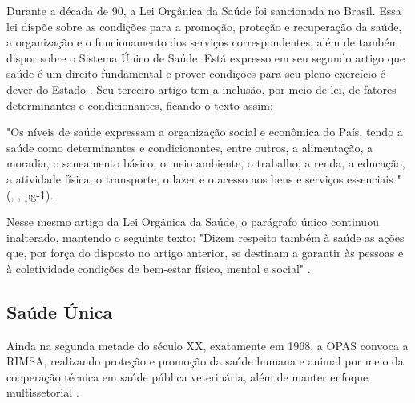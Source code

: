 \indent Durante a década de 90, a Lei Orgânica da Saúde foi sancionada no Brasil. Essa lei dispõe sobre as condições  para a promoção, proteção  e  recuperação  da  saúde,  a  organização  e  o  funcionamento  dos  serviços correspondentes, além de também dispor sobre o Sistema Único de Saúde. Está expresso em seu segundo artigo que saúde é um direito fundamental e prover condições para seu pleno exercício é dever do Estado \cite{BRASIL1990LeiSUS}. Seu terceiro artigo tem a inclusão, por meio de lei, de fatores determinantes e condicionantes, ficando o texto assim:

\begin{citacao}
"Os níveis de saúde expressam a organização social e econômica do País, tendo a saúde como determinantes e condicionantes, entre outros, a alimentação, a moradia, o saneamento básico, o meio ambiente, o trabalho, a renda, a educação, a atividade física, o transporte, o lazer e o acesso aos bens e serviços essenciais "
(\citeauthor{BRASIL2013LeiDeterminantesCondicionantesSaude}, \citeyear{BRASIL2013LeiDeterminantesCondicionantesSaude}, pg-1).
\end{citacao}

\indent Nesse mesmo artigo da Lei Orgânica da Saúde, o parágrafo único continuou inalterado, mantendo o seguinte texto: "Dizem respeito também à saúde as ações que, por força do disposto no artigo anterior, se destinam a garantir às pessoas e à coletividade condições de bem-estar físico, mental e social" \cite{BRASIL1990LeiSUS}.







\subsection{Saúde Única}

\indent Ainda na segunda metade do século XX, exatamente em 1968, a \acrfull{OPAS} convoca a \acrfull{RIMSA}, realizando proteção e promoção da saúde humana e animal por meio da cooperação técnica em saúde pública veterinária, além de manter enfoque multissetorial \cite{S1_OPAS_OMS}.

